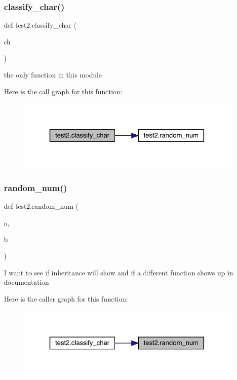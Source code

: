 \subsubsection{\texorpdfstring{classify\_char()}{classify\_char()}}
{\footnotesize\ttfamily def test2.\+classify\+\_\+char (\begin{DoxyParamCaption}\item[{}]{ch }\end{DoxyParamCaption})}

\begin{DoxyVerb}the only function in this module \end{DoxyVerb}
 Here is the call graph for this function\+:
\nopagebreak
\begin{figure}[H]
\begin{center}
\leavevmode
\includegraphics[width=314pt]{namespacetest2_a1fb661490eb37c305e773bbc5305a5a5_cgraph}
\end{center}
\end{figure}
\mbox{\label{namespacetest2_ad51b0e35b3469d6956fcc46f2fac7399}} 
\subsubsection{\texorpdfstring{random\_num()}{random\_num()}}
{\footnotesize\ttfamily def test2.\+random\+\_\+num (\begin{DoxyParamCaption}\item[{}]{a,  }\item[{}]{b }\end{DoxyParamCaption})}

\begin{DoxyVerb}I want to see if inheritance will show and if a different function shows up in documentation \end{DoxyVerb}
 Here is the caller graph for this function\+:
\nopagebreak
\begin{figure}[H]
\begin{center}
\leavevmode
\includegraphics[width=314pt]{namespacetest2_ad51b0e35b3469d6956fcc46f2fac7399_icgraph}
\end{center}
\end{figure}
